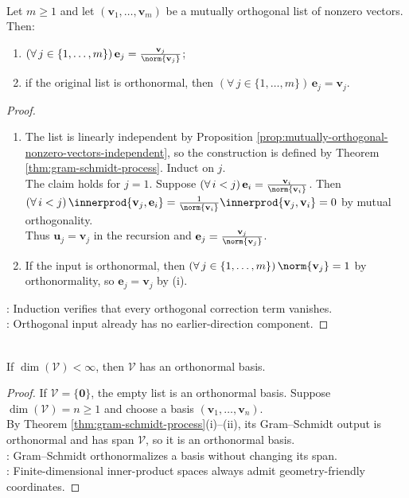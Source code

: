 \begin{lemma} \label{lem:gram-schmidt-preserves-orthogonal-lists} \\
Let $m\geq1$ and let $(\mathbf{v}_1,\ldots,\mathbf{v}_m)$ be a mutually orthogonal list of nonzero vectors. Then:
\begin{enumerate}[label=(\roman*)]
\setlength{\itemsep}{0pt}
\item $(\forall\,j\in\{1,\ldots,m\})\,\mathbf{e}_j=\frac{\mathbf{v}_j}{\norm{\mathbf{v}_j}}$;
\item if the original list is orthonormal, then $(\forall\,j\in\{1,\ldots,m\})\,\mathbf{e}_j=\mathbf{v}_j$.
\end{enumerate}
\begin{proof}
\begin{enumerate}[label=(\roman*)]
\setlength{\itemsep}{0pt}
\item[$(i)$] The list is linearly independent by Proposition \ref{prop:mutually-orthogonal-nonzero-vectors-independent}, so the construction is defined by Theorem \ref{thm:gram-schmidt-process}. Induct on $j$.\\
The claim holds for $j=1$. Suppose $(\forall\,i<j)\,\mathbf{e}_i=\frac{\mathbf{v}_i}{\norm{\mathbf{v}_i}}$. Then $(\forall\,i<j)\,\innerprod{\mathbf{v}_j,\mathbf{e}_i}=\frac{1}{\norm{\mathbf{v}_i}}\innerprod{\mathbf{v}_j,\mathbf{v}_i}=0$ by mutual orthogonality.\\
Thus $\mathbf{u}_j=\mathbf{v}_j$ in the recursion and $\mathbf{e}_j=\frac{\mathbf{v}_j}{\norm{\mathbf{v}_j}}$.
\item[$(ii)$] If the input is orthonormal, then $(\forall\,j\in\{1,\ldots,m\})\,\norm{\mathbf{v}_j}=1$ by orthonormality, so $\mathbf{e}_j=\mathbf{v}_j$ by (i).
\end{enumerate}
: Induction verifies that every orthogonal correction term vanishes.\\
: Orthogonal input already has no earlier-direction component.
\end{proof}
\end{lemma}

\begin{corollary} \label{cor:finite-dimensional-inner-product-space-has-orthonormal-basis} \\
If $\dim(\mathcal{V})<\infty$, then $\mathcal{V}$ has an orthonormal basis.
\begin{proof}
If $\mathcal{V}=\{\mathbf{0}\}$, the empty list is an orthonormal basis. Suppose $\dim(\mathcal{V})=n\geq1$ and choose a basis $(\mathbf{v}_1,\ldots,\mathbf{v}_n)$.\\
By Theorem \ref{thm:gram-schmidt-process}(i)--(ii), its Gram--Schmidt output is orthonormal and has span $\mathcal{V}$, so it is an orthonormal basis.\\
: Gram--Schmidt orthonormalizes a basis without changing its span.\\
: Finite-dimensional inner-product spaces always admit geometry-friendly coordinates.
\end{proof}
\end{corollary}


